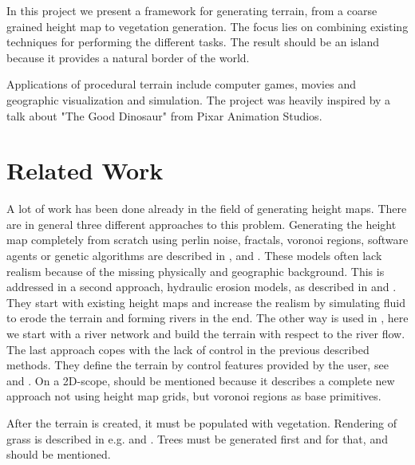 \documentclass[journal, letterpaper]{IEEEtran}
\begin{document}
In this project we present a framework for generating terrain, from a coarse grained height map to vegetation generation. The focus lies on combining existing techniques for performing the different tasks.
The result should be an island because it provides a natural border of the world.

Applications of procedural terrain include computer games, movies and geographic visualization and simulation.
The project was heavily inspired by a talk about "The Good Dinosaur" from Pixar Animation Studios.

\section{Related Work}
A lot of work has been done already in the field of generating height maps. There are in general three different approaches to this problem.
Generating the height map completely from scratch using perlin noise, fractals, voronoi regions, software agents or genetic algorithms are described in \cite{Doran.2010}, \cite{JacobOlsen.2004} and \cite{TeongJooOngRyanSaundersJohnKeyserJohnJ.Leggett.2005}. These models often lack realism because of the missing physically and geographic background. This is addressed in a second approach, hydraulic erosion models, as described in \cite{BedrichBenes.2007} and \cite{Mei.}. They start with existing height maps and increase the realism by simulating fluid to erode the terrain and forming rivers in the end. The other way is used in \cite{JeanDavidGenevauxEricGalinEricGuerinAdrienPeytavieBedrichBenes.2013}, here we start with a river network and build the terrain with respect to the river flow.
The last approach copes with the lack of control in the previous described methods. They define the terrain by control features provided by the user, see \cite{FloraPonjouTasseArnaudEmilienMariePauleCaniStefanieHahmannAdrienBernhardt.2014} and \cite{Hnaidi.2010}.
On a 2D-scope, \cite{AmitPatel.2010} should be mentioned because it describes a complete new approach not using height map grids, but voronoi regions as base primitives.

After the terrain is created, it must be populated with vegetation. Rendering of grass is described in e.g. \cite{KurtPelzer.} and \cite{Boulanger.2005}. Trees must be generated first and for that, \cite{AdamRunionsBrendanLanePrzemyslawPrusinkiewicz.2007} and \cite{Weber.} should be mentioned.
\end{document}
